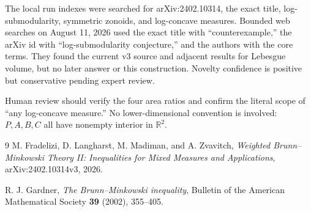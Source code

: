 \documentclass[11pt]{article}
\newcommand{\R}{\mathbb{R}}
\begin{document}
The local run indexes were searched for arXiv:2402.10314, the exact title,
log-submodularity, symmetric zonoids, and log-concave measures.  Bounded web
searches on August 11, 2026 used the exact title with ``counterexample,'' the
arXiv id with ``log-submodularity conjecture,'' and the authors with the core
terms.  They found the current v3 source and adjacent results for Lebesgue
volume, but no later answer or this construction.  Novelty confidence is
positive but conservative pending expert review.

Human review should verify the four area ratios and confirm the literal scope
of ``any log-concave measure.''  No lower-dimensional convention is involved:
$P,A,B,C$ all have nonempty interior in $\R^2$.

\begin{thebibliography}{9}
M. Fradelizi, D. Langharst, M. Madiman, and A. Zvavitch,
\emph{Weighted Brunn--Minkowski Theory II: Inequalities for Mixed Measures and
Applications}, arXiv:2402.10314v3, 2026.

R. J. Gardner,
\emph{The Brunn--Minkowski inequality},
Bulletin of the American Mathematical Society \textbf{39} (2002), 355--405.
\end{thebibliography}
\end{document}
